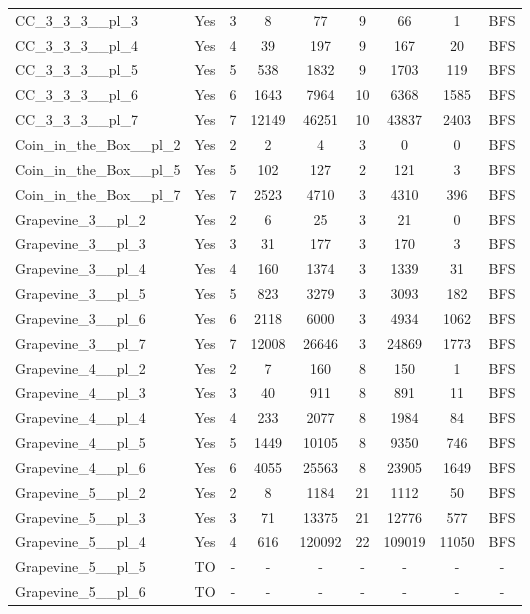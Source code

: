 \documentclass{article}
\begin{document}
\begin{tabular}{lcccccccc}
CC\_3\_3\_3\_\_pl\_3 & Yes & 3 & 8 & 77 & 9 & 66 & 1 & BFS \\
CC\_3\_3\_3\_\_pl\_4 & Yes & 4 & 39 & 197 & 9 & 167 & 20 & BFS \\
CC\_3\_3\_3\_\_pl\_5 & Yes & 5 & 538 & 1832 & 9 & 1703 & 119 & BFS \\
CC\_3\_3\_3\_\_pl\_6 & Yes & 6 & 1643 & 7964 & 10 & 6368 & 1585 & BFS \\
CC\_3\_3\_3\_\_pl\_7 & Yes & 7 & 12149 & 46251 & 10 & 43837 & 2403 & BFS \\
Coin\_in\_the\_Box\_\_pl\_2 & Yes & 2 & 2 & 4 & 3 & 0 & 0 & BFS \\
Coin\_in\_the\_Box\_\_pl\_5 & Yes & 5 & 102 & 127 & 2 & 121 & 3 & BFS \\
Coin\_in\_the\_Box\_\_pl\_7 & Yes & 7 & 2523 & 4710 & 3 & 4310 & 396 & BFS \\
Grapevine\_3\_\_pl\_2 & Yes & 2 & 6 & 25 & 3 & 21 & 0 & BFS \\
Grapevine\_3\_\_pl\_3 & Yes & 3 & 31 & 177 & 3 & 170 & 3 & BFS \\
Grapevine\_3\_\_pl\_4 & Yes & 4 & 160 & 1374 & 3 & 1339 & 31 & BFS \\
Grapevine\_3\_\_pl\_5 & Yes & 5 & 823 & 3279 & 3 & 3093 & 182 & BFS \\
Grapevine\_3\_\_pl\_6 & Yes & 6 & 2118 & 6000 & 3 & 4934 & 1062 & BFS \\
Grapevine\_3\_\_pl\_7 & Yes & 7 & 12008 & 26646 & 3 & 24869 & 1773 & BFS \\
Grapevine\_4\_\_pl\_2 & Yes & 2 & 7 & 160 & 8 & 150 & 1 & BFS \\
Grapevine\_4\_\_pl\_3 & Yes & 3 & 40 & 911 & 8 & 891 & 11 & BFS \\
Grapevine\_4\_\_pl\_4 & Yes & 4 & 233 & 2077 & 8 & 1984 & 84 & BFS \\
Grapevine\_4\_\_pl\_5 & Yes & 5 & 1449 & 10105 & 8 & 9350 & 746 & BFS \\
Grapevine\_4\_\_pl\_6 & Yes & 6 & 4055 & 25563 & 8 & 23905 & 1649 & BFS \\
Grapevine\_5\_\_pl\_2 & Yes & 2 & 8 & 1184 & 21 & 1112 & 50 & BFS \\
Grapevine\_5\_\_pl\_3 & Yes & 3 & 71 & 13375 & 21 & 12776 & 577 & BFS \\
Grapevine\_5\_\_pl\_4 & Yes & 4 & 616 & 120092 & 22 & 109019 & 11050 & BFS \\
Grapevine\_5\_\_pl\_5 & TO & - & - & - & - & - & - & - \\
Grapevine\_5\_\_pl\_6 & TO & - & - & - & - & - & - & - \\

\end{tabular}
\end{document}

